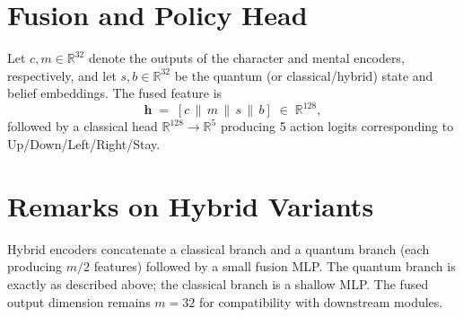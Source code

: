 \documentclass[11pt]{article}
\begin{document}
\section{Fusion and Policy Head}

Let $c,m\in\mathbb{R}^{32}$ denote the outputs of the character and mental encoders, respectively, and let $s,b\in\mathbb{R}^{32}$ be the quantum (or classical/hybrid) state and belief embeddings. The fused feature is
\begin{equation}
\label{eq:fuse}
\bm{h}\;=\;[c\,\|\,m\,\|\,s\,\|\,b]\;\in\;\mathbb{R}^{128},
\end{equation}
followed by a classical head $\mathbb{R}^{128}\to\mathbb{R}^{5}$ producing 5 action logits corresponding to Up/Down/Left/Right/Stay.

\section{Remarks on Hybrid Variants}

Hybrid encoders concatenate a classical branch and a quantum branch (each producing $m/2$ features) followed by a small fusion MLP. The quantum branch is exactly as described above; the classical branch is a shallow MLP. The fused output dimension remains $m=32$ for compatibility with downstream modules.
\end{document}

